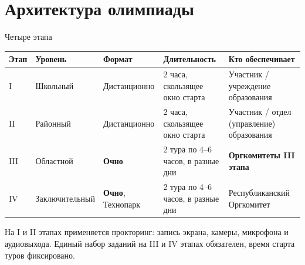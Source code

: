 \section{Архитектура олимпиады}

\begin{frame}{Четыре этапа}
  \vspace{0.2em}
  \small
  \begin{tabular}{@{}p{}p{}p{}p{}p{}@{}}
    \toprule
    \textbf{Этап} & \textbf{Уровень} & \textbf{Формат} & \textbf{Длительность} & \textbf{Кто обеспечивает}\\
    \midrule
    I   & Школьный      & Дистанционно & 2 часа, скользящее окно старта & Участник / учреждение образования \\
    \addlinespace[0.3em]
    II  & Районный      & Дистанционно & 2 часа, скользящее окно старта & Участник / отдел (управление) образования \\
    \addlinespace[0.3em]
    III & Областной     & \textbf{Очно} & 2 тура по 4--6 часов, в разные дни & \textbf{Оргкомитеты III этапа} \\
    \addlinespace[0.3em]
    IV  & Заключительный& \textbf{Очно}, Технопарк & 2 тура по 4--6 часов, в разные дни & Республиканский Оргкомитет \\
    \bottomrule
  \end{tabular}

  \vspace{0.9em}
  {\footnotesize\color{acGray}
  На I и II этапах применяется прокторинг: запись экрана, камеры, микрофона и аудиовыхода.
  Единый набор заданий на III и IV этапах обязателен, время старта туров фиксировано.}
\end{frame}
